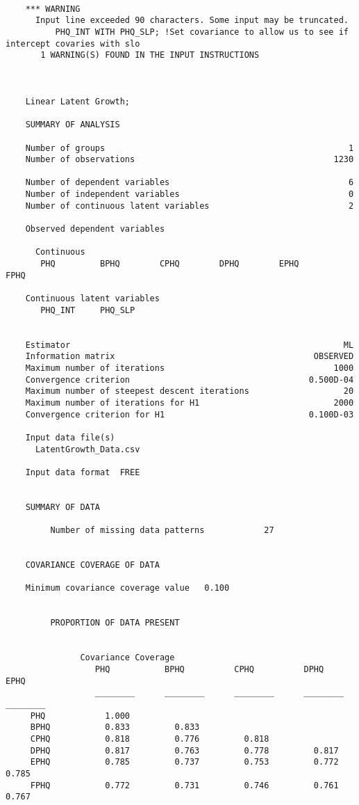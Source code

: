 \documentclass[11pt]{article}
\begin{document}
\begin{verbatim}
    
    
    
    
    *** WARNING
      Input line exceeded 90 characters. Some input may be truncated.
          PHQ_INT WITH PHQ_SLP; !Set covariance to allow us to see if intercept covaries with slo
       1 WARNING(S) FOUND IN THE INPUT INSTRUCTIONS
    
    
    
    Linear Latent Growth;
    
    SUMMARY OF ANALYSIS
    
    Number of groups                                                 1
    Number of observations                                        1230
    
    Number of dependent variables                                    6
    Number of independent variables                                  0
    Number of continuous latent variables                            2
    
    Observed dependent variables
    
      Continuous
       PHQ         BPHQ        CPHQ        DPHQ        EPHQ        FPHQ
    
    Continuous latent variables
       PHQ_INT     PHQ_SLP
    
    
    Estimator                                                       ML
    Information matrix                                        OBSERVED
    Maximum number of iterations                                  1000
    Convergence criterion                                    0.500D-04
    Maximum number of steepest descent iterations                   20
    Maximum number of iterations for H1                           2000
    Convergence criterion for H1                             0.100D-03
    
    Input data file(s)
      LatentGrowth_Data.csv
    
    Input data format  FREE
    
    
    SUMMARY OF DATA
    
         Number of missing data patterns            27
    
    
    COVARIANCE COVERAGE OF DATA
    
    Minimum covariance coverage value   0.100
    
    
         PROPORTION OF DATA PRESENT
    
    
               Covariance Coverage
                  PHQ           BPHQ          CPHQ          DPHQ          EPHQ
                  ________      ________      ________      ________      ________
     PHQ            1.000
     BPHQ           0.833         0.833
     CPHQ           0.818         0.776         0.818
     DPHQ           0.817         0.763         0.778         0.817
     EPHQ           0.785         0.737         0.753         0.772         0.785
     FPHQ           0.772         0.731         0.746         0.761         0.767
    

\end{verbatim}
\end{document}

